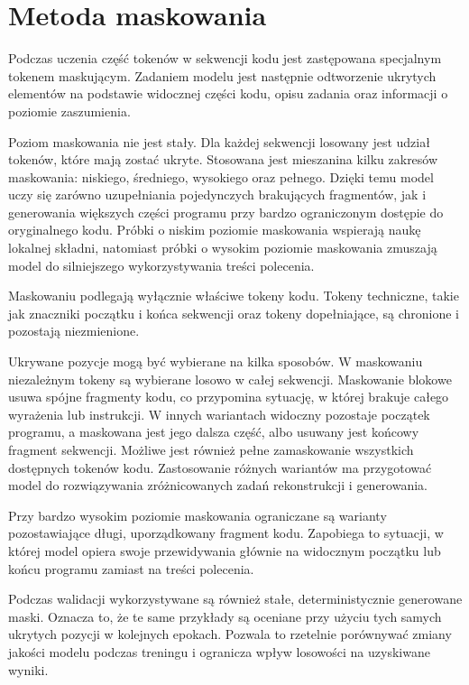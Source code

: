 
\section{Metoda maskowania}
\label{sec:maskowanie}

Podczas uczenia część tokenów w sekwencji kodu jest zastępowana specjalnym tokenem maskującym. Zadaniem modelu jest następnie odtworzenie ukrytych elementów na podstawie widocznej części kodu, opisu zadania oraz informacji o poziomie zaszumienia.

Poziom maskowania nie jest stały. Dla każdej sekwencji losowany jest udział tokenów, które mają zostać ukryte. Stosowana jest mieszanina kilku zakresów maskowania: niskiego, średniego, wysokiego oraz pełnego. Dzięki temu model uczy się zarówno uzupełniania pojedynczych brakujących fragmentów, jak i generowania większych części programu przy bardzo ograniczonym dostępie do oryginalnego kodu. Próbki o niskim poziomie maskowania wspierają naukę lokalnej składni, natomiast próbki o wysokim poziomie maskowania zmuszają model do silniejszego wykorzystywania treści polecenia.

Maskowaniu podlegają wyłącznie właściwe tokeny kodu. Tokeny techniczne, takie jak znaczniki początku i końca sekwencji oraz tokeny dopełniające, są chronione i pozostają niezmienione.

Ukrywane pozycje mogą być wybierane na kilka sposobów. W maskowaniu niezależnym tokeny są wybierane losowo w całej sekwencji. Maskowanie blokowe usuwa spójne fragmenty kodu, co przypomina sytuację, w której brakuje całego wyrażenia lub instrukcji. W innych wariantach widoczny pozostaje początek programu, a maskowana jest jego dalsza część, albo usuwany jest końcowy fragment sekwencji. Możliwe jest również pełne zamaskowanie wszystkich dostępnych tokenów kodu. Zastosowanie różnych wariantów ma przygotować model do rozwiązywania zróżnicowanych zadań rekonstrukcji i generowania.

Przy bardzo wysokim poziomie maskowania ograniczane są warianty pozostawiające długi, uporządkowany fragment kodu. Zapobiega to sytuacji, w której model opiera swoje przewidywania głównie na widocznym początku lub końcu programu zamiast na treści polecenia.

Podczas walidacji wykorzystywane są również stałe, deterministycznie generowane maski. Oznacza to, że te same przykłady są oceniane przy użyciu tych samych ukrytych pozycji w kolejnych epokach. Pozwala to rzetelnie porównywać zmiany jakości modelu podczas treningu i ogranicza wpływ losowości na uzyskiwane wyniki.

